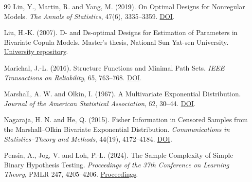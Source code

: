 \documentclass[11pt]{article}
\begin{document}
\begin{thebibliography}{99}
 Lin, Y., Martin, R. and Yang, M. (2019). On Optimal Designs for Nonregular Models. \emph{The Annals of Statistics}, 47(6), 3335--3359. \href{https://doi.org/10.1214/18-AOS1780}{DOI}.

 Liu, H.-K. (2007). D- and Ds-optimal Designs for Estimation of Parameters in Bivariate Copula Models. Master's thesis, National Sun Yat-sen University. \href{https://ethesys.lis.nsysu.edu.tw/ETD-db/ETD-search-c/view_etd?URN=etd-0727107-163046}{University repository}.

 Marichal, J.-L. (2016). Structure Functions and Minimal Path Sets. \emph{IEEE Transactions on Reliability}, 65, 763--768. \href{https://doi.org/10.1109/TR.2015.2513017}{DOI}.

 Marshall, A. W. and Olkin, I. (1967). A Multivariate Exponential Distribution. \emph{Journal of the American Statistical Association}, 62, 30--44. \href{https://doi.org/10.1080/01621459.1967.10482885}{DOI}.

 Nagaraja, H. N. and He, Q. (2015). Fisher Information in Censored Samples from the Marshall--Olkin Bivariate Exponential Distribution. \emph{Communications in Statistics--Theory and Methods}, 44(19), 4172--4184. \href{https://doi.org/10.1080/03610926.2014.972565}{DOI}.

 Pensia, A., Jog, V. and Loh, P.-L. (2024). The Sample Complexity of Simple Binary Hypothesis Testing. \emph{Proceedings of the 37th Conference on Learning Theory}, PMLR 247, 4205--4206. \href{https://proceedings.mlr.press/v247/pensia24a.html}{Proceedings}.
\end{thebibliography}
\endgroup
\end{document}
